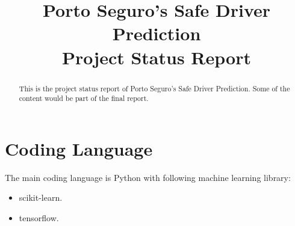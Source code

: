 \documentclass[conference,draft]{IEEEtran}
\begin{document}
\title{Porto Seguro's Safe Driver Prediction\\Project Status Report}
\author{
}

\maketitle

\begin{abstract}
This is the project status report of Porto Seguro's Safe Driver Prediction. Some of the content would be part of the final report.
\end{abstract}









\section{Coding Language}

The main coding language is Python with following machine learning library:
\begin{itemize}
    \item scikit-learn.
    \item tensorflow.
\end{itemize}




\end{document}

